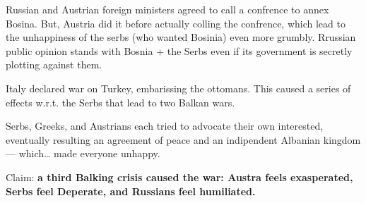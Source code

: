 \documentclass[letterpaper]{article}
\begin{document}
Russian and Austrian foreign ministers agreed to call a confrence to
annex Bosina. But, Austria did it before actually colling the confrence,
which lead to the unhappiness of the serbs (who wanted Bosinia) even
more grumbly. Rrussian public opinion stands with Bosnia + the Serbs
even if its government is secretly plotting against them.

Italy declared war on Turkey, embarissing the ottomans. This caused a
series of effects w.r.t. the Serbs that lead to two Balkan wars.

Serbs, Greeks, and Austrians each tried to advocate their own
interested, eventually resulting an agreement of peace and an
indipendent Albanian kingdom --- which\ldots{} made everyone unhappy.

Claim: \textbf{a third Balking crisis caused the war: Austra feels exasperated,
Serbs feel Deperate, and Russians feel humiliated.}
\end{document}
